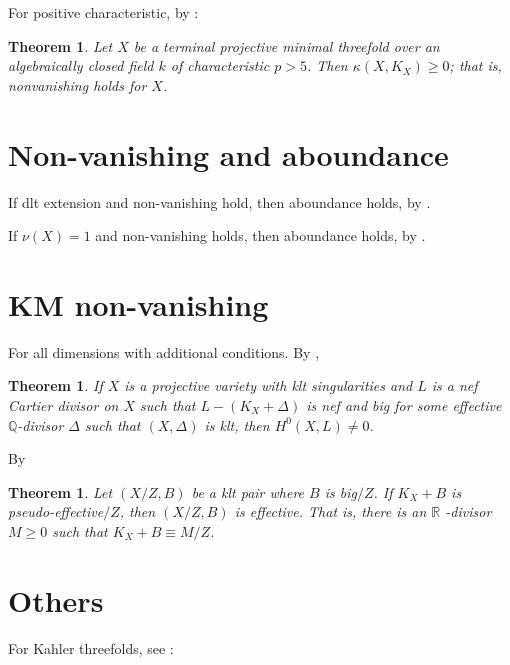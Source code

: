 \documentclass{article}
\newtheorem{theorem}[definition]{Theorem}
\begin{document}
For positive characteristic, by \cite{XZ19}:

\begin{theorem}
  Let \(X\) be a terminal projective minimal threefold over an algebraically closed field \(k\) of characteristic $p > 5$. Then $ \kappa(X,K_{X})\geqslant 0 $; that is, nonvanishing holds for \(X\).
\end{theorem}

\section{Non-vanishing and aboundance}
If dlt extension and non-vanishing hold, then aboundance holds, by \cite{DHP13}.

If $ \nu(X)=1 $ and non-vanishing holds, then aboundance holds, by \cite{LX25}.
\section{KM non-vanishing}

For all dimensions with additional conditions. By \cite{KM98},
\begin{theorem}
  If \(X\) is a projective variety with klt singularities and \(L\) is a nef Cartier divisor on \(X\) such that \(L - (K_X + \Delta)\) is nef and big for some effective \(\mathbb{Q}\)-divisor \(\Delta\) such that \((X, \Delta)\) is klt, then \(H^0(X, L) \neq 0\).
\end{theorem}

By \cite{BP11}
\begin{theorem}
  Let $(X/Z, B)$ be a klt pair where $B$ is big$/Z$. If $K_X + B$ is pseudo-effective$/Z$, then $(X/Z, B)$ is effective. That is, there is an $ \mathbb{R} $ -divisor $M \geqslant 0$ such that $K_X + B \equiv M/Z$.
\end{theorem}
\section{Others}

For Kahler threefolds, see \cite{HLL25}:
\end{document}
